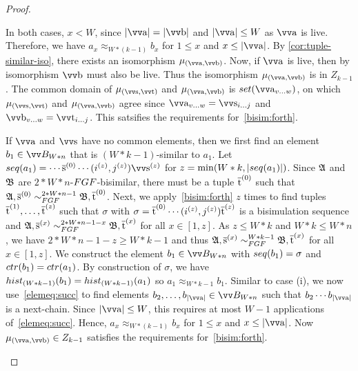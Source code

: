 \begin{proof}
\begin{romanenumerate}
    In both cases, $x < W$, since $|\elemtuptuplea| = |\elemtuptupleb|$ and $|\elemtuptuplea| \le W$ as $\elemtuptuplea$ is live.
    Therefore, we have $a_{x} \approx_{W * (k - 1)} b_{x}$ for $1 \le x$ and $x \le |\elemtuptuplea|$.
    By \cref{cor:tuple-similar-iso}, there exists an isomorphism $\mu_{(\elemtuptuplea,\elemtuptupleb)}$.
    Now, if $\elemtuptuplea$ is live, then by isomorphism $\elemtuptupleb$ must also be live.
    Thus the isomorphism $\mu_{(\elemtuptuplea,\elemtuptupleb)}$ is in $Z_{k-1}$.
    The common domain of $\mu_{(\elemtuptuples,\elemtuptuplet)}$ and $\mu_{(\elemtuptuplea,\elemtuptupleb)}$ is $\set(\elemtuptuplea_{v\ldots{}w})$, on which $\mu_{(\elemtuptuples,\elemtuptuplet)}$ and $\mu_{(\elemtuptuplea,\elemtuptupleb)}$ agree since $\elemtuptuplea_{v\ldots{}w} = \elemtuptuples_{i\ldots{}j}$ and $\elemtuptupleb_{v\ldots{}w} = \elemtuptuplet_{i\ldots{}j}$.
    This satsifies the requirements for~\ref{bisim:forth}.

    \item
    If $\elemtuptuplea$ and $\elemtuptuples$ have no common elements, then we first find an element $b_{1} \in \unraveldom{B}_{W * n}$ that is $(W * k - 1)$-similar to $a_{1}$.
    Let $\seq{a_{1}} = \cdots \elemtuples^{(0)} \cdots (i^{(z)}, j^{(z)}) \elemtuptuples^{(z)}$ for $z = \min(W * k, |\seq{a_{1}}|)$.
    Since ${\mathfrak{A}}$ and ${\mathfrak{B}}$ are $2 * W * n$-$\FGF$-bisimilar, there must be a tuple $\overline{\mathrm{t}}^{(0)}$ such that $\str{A}, \elemtuples^{(0)} \bisimto_{\FGF}^{2 * W * n - 1} \str{B}, \elemtuplet^{(0)}$.
    Next, we apply~\ref{bisim:forth} $z$ times to find tuples $\overline{\mathrm{t}}^{(1)}, \ldots, \overline{\mathrm{t}}^{(z)}$ such that $\sigma$ with $\sigma = \overline{\mathrm{t}}^{(0)}\cdots(i^{(z)}, j^{(z)})\overline{\mathrm{t}}^{(z)}$ is a bisimulation sequence and $\str{A}, \elemtuples^{(x)} \bisimto_{\FGF}^{2 * W * n - 1 - x} \str{B}, \elemtuplet^{(x)}$ for all $x \in [1,z]$.
    As $z \le W * k$ and $W * k \le W * n$, we have $2 * W * n - 1 - z \ge  W * k - 1$ and thus $\str{A}, \elemtuples^{(x)} \bisimto_{\FGF}^{W * k - 1} \str{B}, \elemtuplet^{(x)}$ for all $x \in [1, z]$.
    We construct the element $b_{1} \in \unraveldom{B}_{W * n}$ with $\seq{b_{1}} = \sigma$ and $\ctr{b_{1}} = \ctr{a_{1}}$.
    By construction of $\sigma$, we have $\hist{(W * k - 1)}{b_{1}} = \hist{(W * k - 1)}{a_{1}}$ so $a_{1} \approx_{W * k - 1} b_{1}$.
    Similar to case (i), we now use~\ref{elemeq:succ} to find elements $b_{2}, \ldots, b_{|\elemtuptuplea|} \in \unraveldom{B}_{W * n}$ such that $b_{2} \cdots b_{|\elemtuptuplea|}$ is a next-chain.
    Since $|\elemtuptuplea| \le W$, this requires at most $W - 1$ applications of~\ref{elemeq:succ}.
    Hence, $a_{x} \approx_{W * (k-1)} b_{x}$ for $1 \le x$ and $x \le |\elemtuptuplea|$.
    Now $\mu_{(\elemtuptuplea, \elemtuptupleb)} \in Z_{k-1}$ satisfies the requirements for~\ref{bisim:forth}.
  \end{romanenumerate}
\end{proof}
